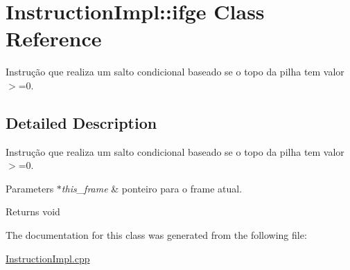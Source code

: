 \hypertarget{class_instruction_impl_1_1ifge}{}\section{Instruction\+Impl\+:\+:ifge Class Reference}
\label{class_instruction_impl_1_1ifge}


Instrução que realiza um salto condicional baseado se o topo da pilha tem valor $>$=0.  




\subsection{Detailed Description}
Instrução que realiza um salto condicional baseado se o topo da pilha tem valor $>$=0. 


\begin{DoxyParams}{Parameters}
{\em $\ast$this\+\_\+frame} & ponteiro para o frame atual. \\
\hline
\end{DoxyParams}
\begin{DoxyReturn}{Returns}
void 
\end{DoxyReturn}


The documentation for this class was generated from the following file\+:\begin{DoxyCompactItemize}
\item 
\hyperlink{_instruction_impl_8cpp}{Instruction\+Impl.\+cpp}\end{DoxyCompactItemize}
